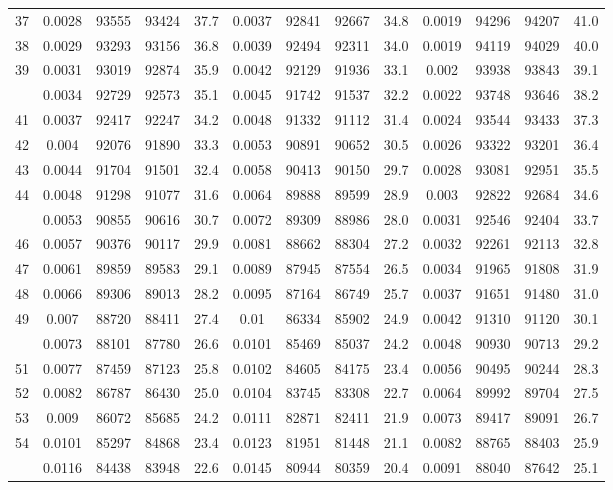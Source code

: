 \documentclass[
  14pt,
]{article}
\begin{document}
\begin{longtable}[t]{lcccccccccccc}
37 & 0.0028 & 93555 & 93424 & 37.7 & 0.0037 & 92841 & 92667 & 34.8 & 0.0019 & 94296 & 94207 & 41.0\\
38 & 0.0029 & 93293 & 93156 & 36.8 & 0.0039 & 92494 & 92311 & 34.0 & 0.0019 & 94119 & 94029 & 40.0\\
39 & 0.0031 & 93019 & 92874 & 35.9 & 0.0042 & 92129 & 91936 & 33.1 & 0.002 & 93938 & 93843 & 39.1\\
\addlinespace
40 & 0.0034 & 92729 & 92573 & 35.1 & 0.0045 & 91742 & 91537 & 32.2 & 0.0022 & 93748 & 93646 & 38.2\\
41 & 0.0037 & 92417 & 92247 & 34.2 & 0.0048 & 91332 & 91112 & 31.4 & 0.0024 & 93544 & 93433 & 37.3\\
42 & 0.004 & 92076 & 91890 & 33.3 & 0.0053 & 90891 & 90652 & 30.5 & 0.0026 & 93322 & 93201 & 36.4\\
43 & 0.0044 & 91704 & 91501 & 32.4 & 0.0058 & 90413 & 90150 & 29.7 & 0.0028 & 93081 & 92951 & 35.5\\
44 & 0.0048 & 91298 & 91077 & 31.6 & 0.0064 & 89888 & 89599 & 28.9 & 0.003 & 92822 & 92684 & 34.6\\
\addlinespace
45 & 0.0053 & 90855 & 90616 & 30.7 & 0.0072 & 89309 & 88986 & 28.0 & 0.0031 & 92546 & 92404 & 33.7\\
46 & 0.0057 & 90376 & 90117 & 29.9 & 0.0081 & 88662 & 88304 & 27.2 & 0.0032 & 92261 & 92113 & 32.8\\
47 & 0.0061 & 89859 & 89583 & 29.1 & 0.0089 & 87945 & 87554 & 26.5 & 0.0034 & 91965 & 91808 & 31.9\\
48 & 0.0066 & 89306 & 89013 & 28.2 & 0.0095 & 87164 & 86749 & 25.7 & 0.0037 & 91651 & 91480 & 31.0\\
49 & 0.007 & 88720 & 88411 & 27.4 & 0.01 & 86334 & 85902 & 24.9 & 0.0042 & 91310 & 91120 & 30.1\\
\addlinespace
50 & 0.0073 & 88101 & 87780 & 26.6 & 0.0101 & 85469 & 85037 & 24.2 & 0.0048 & 90930 & 90713 & 29.2\\
51 & 0.0077 & 87459 & 87123 & 25.8 & 0.0102 & 84605 & 84175 & 23.4 & 0.0056 & 90495 & 90244 & 28.3\\
52 & 0.0082 & 86787 & 86430 & 25.0 & 0.0104 & 83745 & 83308 & 22.7 & 0.0064 & 89992 & 89704 & 27.5\\
53 & 0.009 & 86072 & 85685 & 24.2 & 0.0111 & 82871 & 82411 & 21.9 & 0.0073 & 89417 & 89091 & 26.7\\
54 & 0.0101 & 85297 & 84868 & 23.4 & 0.0123 & 81951 & 81448 & 21.1 & 0.0082 & 88765 & 88403 & 25.9\\
\addlinespace
55 & 0.0116 & 84438 & 83948 & 22.6 & 0.0145 & 80944 & 80359 & 20.4 & 0.0091 & 88040 & 87642 & 25.1\\

\end{longtable}
\end{document}
